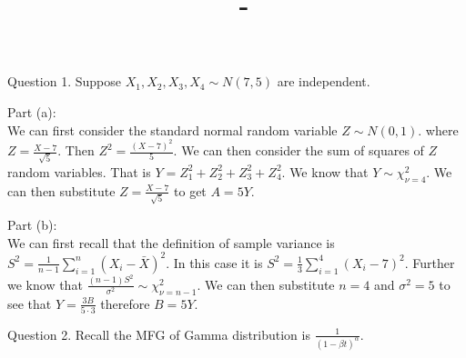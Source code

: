 \documentclass[answers,12pt,addpoints]{exam}
\author{\name}
\title{\course \ - \assignment}
\begin{document}
\maketitle
\begin{questions}
    \question Question 1.
    Suppose $X_1 , X_2, X_3, X_4 \sim N(7,5)$ are independent. 
    \begin{solution}
        Part (a):\\
        We can first consider the standard normal random variable $Z \sim N(0,1)$. where $Z = \frac{X - 7}{\sqrt{5}}$. Then $Z^2 = \frac{(X - 7)^2}{5}$. We can then consider the sum of squares of $Z$ random variables. That is $Y = Z_1^2 + Z_2^2 + Z_3^2 + Z_4^2$. We know that $Y \sim \chi^2_{\nu = 4}$. We can then substitute $Z = \frac{X - 7}{\sqrt{5}}$ to get $A = 5Y$.\\
    \end{solution}
    \begin{solution}
        Part (b):\\
        We can first recall that the definition of sample variance is $S^2 = \frac{1}{n-1}\sum_{i=1}^{n}(X_i - \bar{X})^2$. In this case it is $S^2 = \frac{1}{3}\sum_{i=1}^{4}(X_i - 7)^2$. Further we know that $\frac{(n-1)S^2}{\sigma^2} \sim \chi^2_{\nu = n-1}$. We can then substitute $n = 4$ and $\sigma^2 = 5$ to see that $Y = \frac{3B}{5 \cdot 3}$ therefore $B = 5Y$.\\ 
    \end{solution}
    \question Question 2. 
    Recall the MFG of Gamma distribution is $\frac{1}{(1-\beta t)^{\alpha}}$. 
\end{questions}
\end{document}
